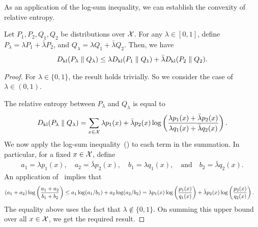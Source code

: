             As an application of the log-sum inequality, we can establish the convexity of relative entropy.                      
            \begin{theorem}
                \label{thm:convexity-relative-entropy}
                Let $P_1, P_2, Q_1, Q_2$ be distributions over $\mathcal{X}$. For any $\lambda \in [0,1]$, define $P_\lambda = \lambda P_1 + \bar{\lambda} P_2$,  and $Q_\lambda = \lambda Q_1 + \bar{\lambda} Q_2$. Then, we have 
                \begin{align}
                    D_{\text{kl}}(P_\lambda \parallel Q_\lambda) \leq \lambda D_{\text{kl}}(P_1 \parallel Q_1) + \bar{\lambda} D_{\text{kl}}(P_2 \parallel Q_2). 
                \end{align}
            \end{theorem}

            \begin{proof}
                For $\lambda \in \{0, 1\}$, the result holds trivially. So we consider the case of $\lambda \in (0, 1)$. 
                
                The relative entropy between $P_\lambda$ and $Q_\lambda$ is equal to 
                \begin{align}
                        D_{\text{kl}}(P_\lambda \parallel Q_\lambda) = \sum_{x \in \mathcal{X}} \lambda p_1(x) + \bar{\lambda} p_2(x) \log \left( \frac{\lambda p_1(x) + \bar{\lambda}p_2(x)} {\lambda q_1(x) + \bar{\lambda}q_2(x)} \right). 
                \end{align}
                We now apply the log-sum inequality~() to each term in the summation. In particular, for a fixed $x \in \mathcal{X}$, define 
                \begin{align}
                    a_1 = \lambda p_1(x), \quad a_2 = \bar{\lambda}p_2(x), \quad b_1 = \lambda q_1(x), \quad \text{and} \quad b_2 = \bar{\lambda} q_2(x). 
                \end{align}
                An application of~ implies that 
                \begin{align}
                    (a_1 + a_2) \log \left( \frac{a_1 + a_2}{b_1 + b_2} \right) &\leq a_1 \log(a_1/b_1) + a_2 \log (a_2/b_2)  
                     = \lambda p_1(x) \log \left( \frac{p_1(x)}{q_1(x)} \right)  + \bar{\lambda} p_2(x) \log \left( \frac{p_2(x)}{q_2(x)} \right). 
                \end{align}
                The equality above uses the fact that $\lambda \not \in \{0, 1\}$. On summing this upper bound over all $x \in \mathcal{X}$, we get the required result. 
            \end{proof}

